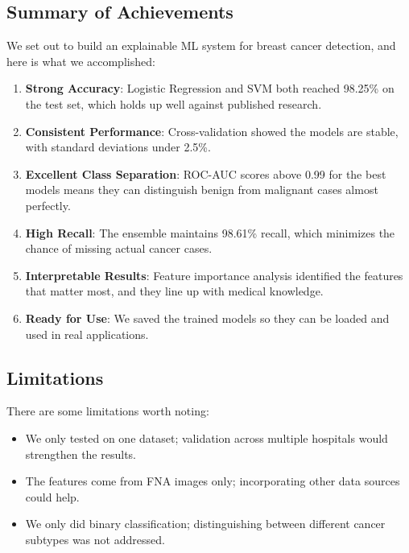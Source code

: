 \documentclass[12pt]{article}
\begin{document}
\subsection{Summary of Achievements}

We set out to build an explainable ML system for breast cancer detection, and here is what we accomplished:

\begin{enumerate}
    \item \textbf{Strong Accuracy}: Logistic Regression and SVM both reached 98.25\% on the test set, which holds up well against published research.
    
    \item \textbf{Consistent Performance}: Cross-validation showed the models are stable, with standard deviations under 2.5\%.
    
    \item \textbf{Excellent Class Separation}: ROC-AUC scores above 0.99 for the best models means they can distinguish benign from malignant cases almost perfectly.
    
    \item \textbf{High Recall}: The ensemble maintains 98.61\% recall, which minimizes the chance of missing actual cancer cases.
    
    \item \textbf{Interpretable Results}: Feature importance analysis identified the features that matter most, and they line up with medical knowledge.
    
    \item \textbf{Ready for Use}: We saved the trained models so they can be loaded and used in real applications.
\end{enumerate}

\subsection{Limitations}

There are some limitations worth noting:
\begin{itemize}
    \item We only tested on one dataset; validation across multiple hospitals would strengthen the results.
    \item The features come from FNA images only; incorporating other data sources could help.
    \item We only did binary classification; distinguishing between different cancer subtypes was not addressed.
\end{itemize}
\end{document}
